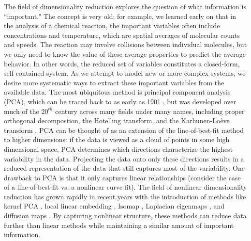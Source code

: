 \documentclass[12pt]{article}
\begin{document}
The field of dimensionality reduction explores the question of what information is ``important." The concept is very old; for example, we learned early on that in the analysis of a chemical reaction, the important variables often include concentrations and temperature, which are spatial averages of molecular counts and speeds. The reaction may involve collisions between individual molecules, but we only need to know the value of these average properties to predict the average behavior. In other words, the reduced set of variables constitutes a closed-form, self-contained system. As we attempt to model new or more complex systems, we desire more systematic ways to extract these important variables from the available data. The most ubiquitous method is principal component analysis (PCA), which can be traced back to as early as 1901 \cite{Pearson1901}, but was developed over much of the $20^{th}$ century across many fields under many names, including proper orthogonal decompostion, the Hotelling transform, and the Karhunen-Lo\`{e}ve transform \cite{Kerschen2005, Hotelling1933, Sirovich1987}. PCA can be thought of as an extension of the line-of-best-fit method to higher dimensions: if the data is viewed as a cloud of points in some high dimensional space, PCA determines which directions characterize the highest variability in the data. Projecting the data onto only these directions results in a reduced representation of the data that still captures most of the variability. One drawback to PCA is that it only captures linear relationships (consider the case of a line-of-best-fit vs. a nonlinear curve fit). The field of nonlinear dimensionality reduction has grown rapidly in recent years with the introduction of methods like kernel PCA \cite{Scholkopf1998}, local linear embedding \cite{Roweis2000}, Isomap \cite{Tenenbaum2000}, Laplacian eigenmaps \cite{Belkin2003}, and diffusion maps \cite{Coifman2005, Coifman2005a, Coifman2006}. By capturing nonlinear structure, these methods can reduce data further than linear methods while maintaining a similar amount of important information.\vspace{1mm}
\end{document}
